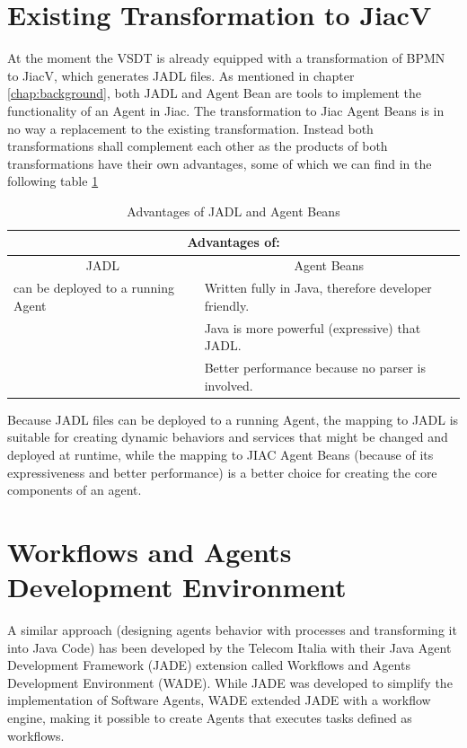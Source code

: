 \section{Existing Transformation to JiacV}
At the moment the VSDT is already equipped with a transformation of BPMN to JiacV, which generates JADL files.
As mentioned in chapter \ref{chap:background}, both JADL and Agent Bean are tools to implement the functionality of an Agent in Jiac. 
The transformation to Jiac Agent Beans is in no way a replacement to the existing transformation. Instead both transformations shall complement each other as the products of both transformations have their own advantages, some of which we can find in the following table \ref{tab:benefits}
\begin{table}[htbp]
	\centering
		\begin{tabularx}{\linewidth}{|l|X|}\hline\hline
			\multicolumn{2}{|c|}{\textbf{Advantages of:}} \\\hline
			\multicolumn{1}{|c|}{JADL} & \multicolumn{1}{c|}{Agent Beans}\\\hline
			can be deployed to a running Agent &  Written fully in Java, therefore developer friendly.\\
																				 &  Java is more powerful (expressive) that JADL.\\
			                           				 &  Better performance because no parser is involved.\\\hline\hline
		\end{tabularx}
		\caption{Advantages of JADL and Agent Beans}
		\label{tab:benefits}
\end{table}

\newpage
Because JADL files can be deployed to a running Agent, the mapping to JADL is suitable for creating dynamic behaviors and services that might be changed and deployed at runtime, while the mapping to JIAC Agent Beans (because of its expressiveness and better performance) is a better choice for creating the core components of an agent. 


\section{Workflows and Agents Development Environment}
\label{sec:wade}
A similar approach (designing agents behavior with processes and transforming it into Java Code) has been developed by the Telecom Italia with their Java Agent Development Framework (JADE) extension called Workflows and Agents Development Environment (WADE). While JADE was developed to simplify the implementation of Software Agents, WADE extended JADE with a workflow engine, making it possible to create Agents that executes tasks defined as workflows.

